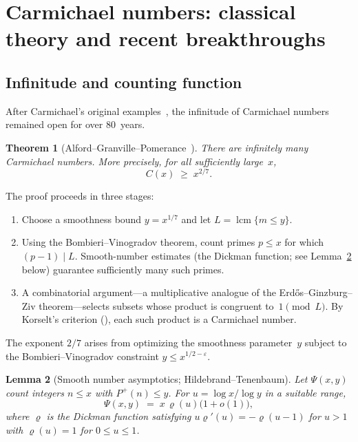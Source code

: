 \documentclass[12pt]{amsart}
\theoremstyle{plain}
\newtheorem{theorem}{Theorem}[section]
\newtheorem{lemma}[theorem]{Lemma}
\theoremstyle{definition}
\theoremstyle{remark}
\DeclareMathOperator{\lcm}{lcm}
\newcommand{\Pp}{P^{+}}
\begin{document}
\section{Carmichael numbers: classical theory and recent
  breakthroughs}\label{sec:carmichael}

\subsection{Infinitude and counting function}\label{subsec:agp}

After Carmichael's original examples~\cite{carmichael1910}, the
infinitude of Carmichael numbers remained open for over 80~years.

\begin{theorem}[Alford--Granville--Pomerance~\cite{agp1994}]
\label{thm:agp}
There are infinitely many Carmichael numbers.  More precisely, for all
sufficiently large~$x$,
\[
  C(x) \;\ge\; x^{2/7}.
\]
\end{theorem}

The proof proceeds in three stages:
\begin{enumerate}
\item Choose a smoothness bound $y=x^{1/7}$ and let $L=\lcm\{m\le y\}$.
\item Using the Bombieri--Vinogradov theorem, count primes $p\le x$
  for which $(p-1)\mid L$.  Smooth-number estimates (the Dickman
  function; see Lemma~\ref{lem:dickman} below) guarantee sufficiently many
  such primes.
\item A combinatorial argument---a multiplicative analogue of the
  Erd\H{o}s--Ginzburg--Ziv theorem---selects subsets whose product is
  congruent to~$1\pmod{L}$.  By Korselt's criterion
  (), each such product is a Carmichael number.
\end{enumerate}
The exponent $2/7$ arises from optimizing the smoothness
parameter~$y$ subject to the Bombieri--Vinogradov constraint $y\le
x^{1/2-\varepsilon}$.

\begin{lemma}[Smooth number asymptotics; Hildebrand--Tenenbaum]
\label{lem:dickman}
Let $\Psi(x,y)$ count integers $n\le x$ with $\Pp(n)\le y$.  For
$u=\log x/\log y$ in a suitable range,
\[
  \Psi(x,y) \;=\; x\,\varrho(u)\bigl(1+o(1)\bigr),
\]
where $\varrho$ is the Dickman function satisfying $u\varrho'(u)=
-\varrho(u-1)$ for $u>1$ with $\varrho(u)=1$ for $0\le u\le 1$.
\end{lemma}
\end{document}
